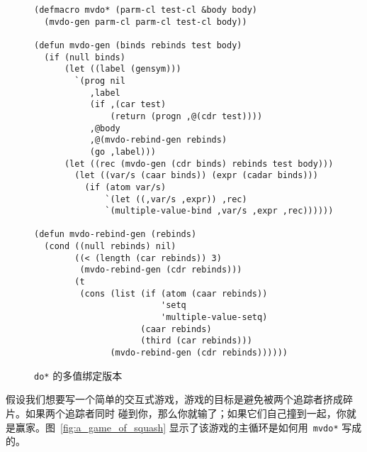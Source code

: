 \begin{figure}
\begin{lstlisting}
(defmacro mvdo* (parm-cl test-cl &body body)
  (mvdo-gen parm-cl parm-cl test-cl body))

(defun mvdo-gen (binds rebinds test body)
  (if (null binds)
      (let ((label (gensym)))
        `(prog nil
           ,label
           (if ,(car test)
               (return (progn ,@(cdr test))))
           ,@body
           ,@(mvdo-rebind-gen rebinds)
           (go ,label)))
      (let ((rec (mvdo-gen (cdr binds) rebinds test body)))
        (let ((var/s (caar binds)) (expr (cadar binds)))
          (if (atom var/s)
              `(let ((,var/s ,expr)) ,rec)
              `(multiple-value-bind ,var/s ,expr ,rec))))))

(defun mvdo-rebind-gen (rebinds)
  (cond ((null rebinds) nil)
        ((< (length (car rebinds)) 3)
         (mvdo-rebind-gen (cdr rebinds)))
        (t
         (cons (list (if (atom (caar rebinds))
                         'setq
                         'multiple-value-setq)
                     (caar rebinds)
                     (third (car rebinds)))
               (mvdo-rebind-gen (cdr rebinds))))))
\end{lstlisting}
  \caption{\texttt{do*} 的多值绑定版本}
  \label{fig:multiple_value_binding_version_of_dostar}
\end{figure}

假设我们想要写一个简单的交互式游戏，游戏的目标是避免被两个追踪者挤成碎片。如果两个追踪者同时
碰到你，那么你就输了；如果它们自己撞到一起，你就是赢家。图~\ref{fig:a_game_of_squash}
显示了该游戏的主循环是如何用~\texttt{mvdo*} 写成的。


